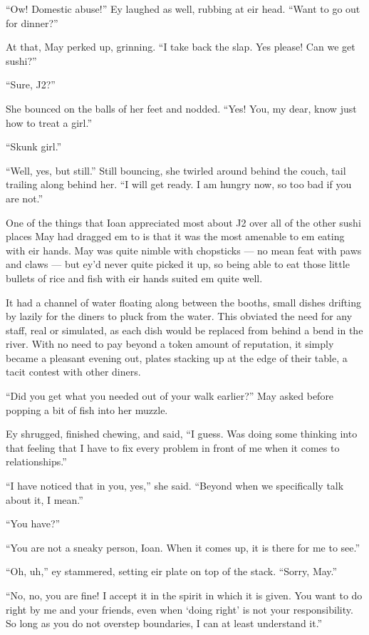 ``Ow! Domestic abuse!'' Ey laughed as well, rubbing at eir head. ``Want to go out for dinner?''

At that, May perked up, grinning. ``I take back the slap. Yes please! Can we get sushi?''

``Sure, J2?''

She bounced on the balls of her feet and nodded. ``Yes! You, my dear, know just how to treat a girl.''

``Skunk girl.''

``Well, yes, but still.'' Still bouncing, she twirled around behind the couch, tail trailing along behind her. ``I will get ready. I am hungry now, so too bad if you are not.''

One of the things that Ioan appreciated most about J2 over all of the other sushi places May had dragged em to is that it was the most amenable to em eating with eir hands. May was quite nimble with chopsticks — no mean feat with paws and claws — but ey'd never quite picked it up, so being able to eat those little bullets of rice and fish with eir hands suited em quite well.

It had a channel of water floating along between the booths, small dishes drifting by lazily for the diners to pluck from the water. This obviated the need for any staff, real or simulated, as each dish would be replaced from behind a bend in the river. With no need to pay beyond a token amount of reputation, it simply became a pleasant evening out, plates stacking up at the edge of their table, a tacit contest with other diners.

``Did you get what you needed out of your walk earlier?'' May asked before popping a bit of fish into her muzzle.

Ey shrugged, finished chewing, and said, ``I guess. Was doing some thinking into that feeling that I have to fix every problem in front of me when it comes to relationships.''

``I have noticed that in you, yes,'' she said. ``Beyond when we specifically talk about it, I mean.''

``You have?''

``You are not a sneaky person, Ioan. When it comes up, it is there for me to see.''

``Oh, uh,'' ey stammered, setting eir plate on top of the stack. ``Sorry, May.''

``No, no, you are fine! I accept it in the spirit in which it is given. You want to do right by me and your friends, even when `doing right' is not your responsibility. So long as you do not overstep boundaries, I can at least understand it.''

